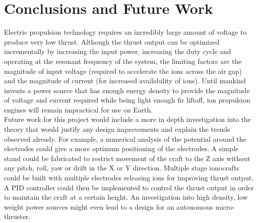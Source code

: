 \documentclass[11pt]{article}
\begin{document}
\pagebreak
\section{Conclusions and Future Work}

Electric propulsion technology requires an incredibly large amount of voltage to produce very low thrust. Although the thrust output can be optimized incrementally by increasing the input power, increasing the duty cycle and operating at the resonant frequency of the system, the limiting factors are the magnitude of input voltage (required to accelerate the ions across the air gap) and the magnitude of current (for increased availability of ions). Until mankind invents a power source that has enough energy density to provide the magnitude of voltage and current required while being light enough fir liftoff, ion propulsion engines will remain impractical for use on Earth.\\

Future work for this project would include a more in depth investigation into the theory that would justify any design improvements and explain the  trends observed already. For example, a numerical analysis of the potential around the electrodes could give a more optimum positioning of the electrodes. A simple stand could be fabricated to restrict movement of the craft to the Z axis without any pitch, roll, yaw or drift in the X or Y direction. Multiple stage ionocrafts could be built with multiple electrodes releasing ions for improving thrust output. A PID controller could then be implemented to control the thrust output in order to maintain the craft at a certain height. An investigation into high density, low weight power sources might even lead to a design for an autonomous micro-thruster.


\pagebreak
\end{document}
